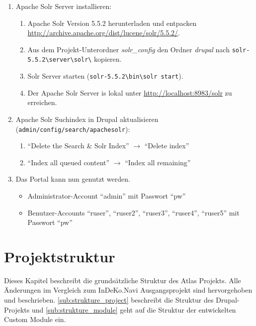 \begin{enumerate}
	\item Apache Solr Server installieren:
	\begin{enumerate}
		\item Apache Solr Version 5.5.2 herunterladen und entpacken \url{http://archive.apache.org/dist/lucene/solr/5.5.2/}.

		\item Aus dem Projekt-Unterordner \textit{solr\_config} den Ordner \textit{drupal} nach \lstinline|solr-5.5.2\server\solr\| kopieren.

		\item Solr Server starten (\zB \lstinline|solr-5.5.2\bin\solr start|).
		\item Der Apache Solr Server is lokal unter \url{http://localhost:8983/solr} zu erreichen.
	\end{enumerate}

	\item Apache Solr Suchindex in Drupal aktualisieren (\lstinline|admin/config/search/apachesolr|):
	\begin{enumerate}
		\item \enquote{Delete the Search \& Solr Index} $\rightarrow$ \enquote{Delete index}

		\item \enquote{Index all queued content}  $\rightarrow$ \enquote{Index all remaining}
	\end{enumerate}

	\item Das Portal kann nun genutzt werden.
	\begin{itemize}
		\item Administrator-Account \enquote{admin} mit Passwort \enquote{pw}
		\item Benutzer-Accounts \enquote{ruser}, \enquote{ruser2}, \enquote{ruser3}, \enquote{ruser4}, \enquote{ruser5}  mit Passwort \enquote{pw}
	\end{itemize}
\end{enumerate}



\section{Projektstruktur}
Dieses Kapitel beschreibt die grundsätzliche Struktur des Atlas Projekts. Alle Änderungen im Vergleich zum InDeKo.Navi Ausgangsprojekt sind hervorgehoben und beschrieben. \cref{sub:strukture_project} beschreibt die Struktur des Drupal-Projekts und \cref{sub:strukture_module} geht auf die Struktur der entwickelten Custom Module ein.


